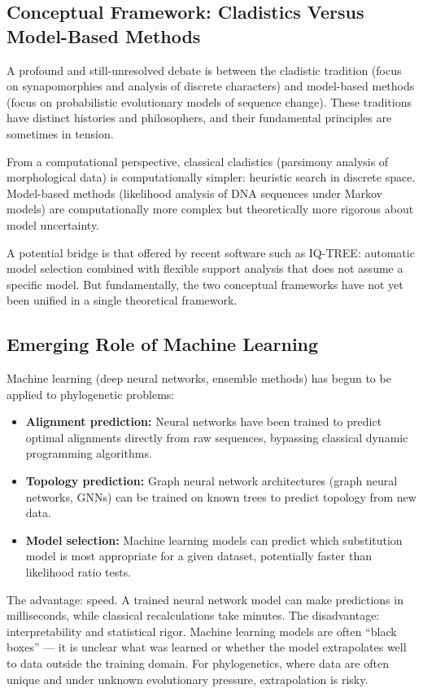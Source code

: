 \subsection{Conceptual Framework: Cladistics Versus Model-Based Methods}

A profound and still-unresolved debate is between the cladistic tradition (focus on synapomorphies and analysis of discrete characters) and model-based methods (focus on probabilistic evolutionary models of sequence change). These traditions have distinct histories and philosophers, and their fundamental principles are sometimes in tension.

From a computational perspective, classical cladistics (parsimony analysis of morphological data) is computationally simpler: heuristic search in discrete space. Model-based methods (likelihood analysis of DNA sequences under Markov models) are computationally more complex but theoretically more rigorous about model uncertainty.

A potential bridge is that offered by recent software such as IQ-TREE: automatic model selection combined with flexible support analysis that does not assume a specific model. But fundamentally, the two conceptual frameworks have not yet been unified in a single theoretical framework.

\subsection{Emerging Role of Machine Learning}

Machine learning (deep neural networks, ensemble methods) has begun to be applied to phylogenetic problems:

\begin{itemize}
\item \textbf{Alignment prediction:} Neural networks have been trained to predict optimal alignments directly from raw sequences, bypassing classical dynamic programming algorithms.
\item \textbf{Topology prediction:} Graph neural network architectures (graph neural networks, GNNs) can be trained on known trees to predict topology from new data.
\item \textbf{Model selection:} Machine learning models can predict which substitution model is most appropriate for a given dataset, potentially faster than likelihood ratio tests.
\end{itemize}

The advantage: speed. A trained neural network model can make predictions in milliseconds, while classical recalculations take minutes. The disadvantage: interpretability and statistical rigor. Machine learning models are often ``black boxes'' --- it is unclear what was learned or whether the model extrapolates well to data outside the training domain. For phylogenetics, where data are often unique and under unknown evolutionary pressure, extrapolation is risky.

